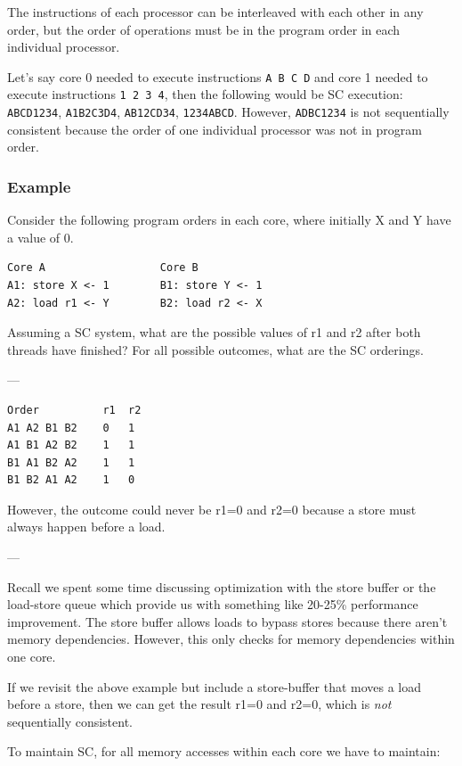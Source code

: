 \documentclass{article}
\begin{document}
The instructions of each processor can be interleaved with each other in any order, but the order of operations must be in the program order in each individual processor. 

Let's say core 0 needed to execute instructions \verb|A B C D| and core 1 needed to execute instructions \verb|1 2 3 4|, then the following would be SC execution: \verb|ABCD1234|, \verb|A1B2C3D4|, \verb|AB12CD34|, \verb|1234ABCD|.  However, \verb|ADBC1234| is not sequentially consistent because the order of one individual processor was not in program order. 


\subsubsection*{Example}

Consider the following program orders in each core, where initially X and Y have a value of 0.

\begin{verbatim}
Core A                  Core B
A1: store X <- 1        B1: store Y <- 1
A2: load r1 <- Y        B2: load r2 <- X 
\end{verbatim}

Assuming a SC system, what are the possible values of r1 and r2 after both threads have finished? For all possible outcomes, what are the SC orderings.

---

\begin{verbatim}
Order          r1  r2
A1 A2 B1 B2    0   1
A1 B1 A2 B2    1   1
B1 A1 B2 A2    1   1
B1 B2 A1 A2    1   0
\end{verbatim}


However, the outcome could never be r1=0 and r2=0 because a store must always happen before a load.

---

Recall we spent some time discussing optimization with the store buffer or the load-store queue which provide us with something like 20-25\% performance improvement. The store buffer allows loads to bypass stores because there aren't memory dependencies. However, this only checks for memory dependencies within one core. 

If we revisit the above example but include a store-buffer that moves a load before a store, then we can get the result r1=0 and r2=0, which is \textit{not} sequentially consistent.

To maintain SC, for all memory accesses within each core we have to maintain:
\end{document}
